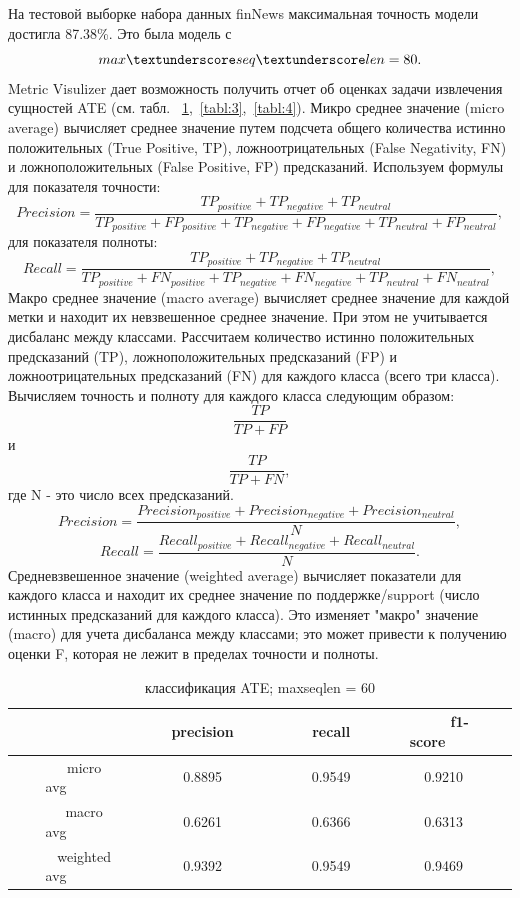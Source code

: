 На тестовой выборке набора данных finNews максимальная точность модели достигла 87.38\%. Это была модель с \[max\textunderscore seq\textunderscore len = 80.\] Metric Visulizer дает возможность получить отчет об оценках задачи извлечения сущностей ATE (см. табл. ~\ref{tabl:2},~\ref{tabl:3},~\ref{tabl:4}). Микро среднее значение (micro average) вычисляет среднее значение путем подсчета общего количества истинно положительных (True Positive, TP), ложноотрицательных (False Negativity, FN) и ложноположительных  (False Positive, FP) предсказаний. Используем формулы\\ для показателя точности: 
\[Precision = \frac{TP_{positive} + TP_{negative} + TP_{neutral}}{TP_{positive} + FP_{positive} + TP_{negative} + FP_{negative} + TP_{neutral} + FP_{neutral}},\]
для показателя полноты:
\[Recall = \frac{TP_{positive} + TP_{negative} + TP_{neutral}}{TP_{positive} + FN_{positive} + TP_{negative} + FN_{negative} + TP_{neutral} + FN_{neutral}},\]
Макро среднее значение (macro average) вычисляет среднее значение для каждой метки и находит их невзвешенное среднее значение. При этом не учитывается дисбаланс между классами. Рассчитаем количество истинно положительных предсказаний (TP), ложноположительных предсказаний (FP) и ложноотрицательных предсказаний (FN) для каждого класса (всего три класса). Вычисляем точность и полноту для каждого класса следующим образом: \[\frac{TP}{TP + FP}\] и \[\frac{TP}{TP + FN},\] где N - это число всех предсказаний.
\[Precision = \frac{Precision_{positive} + Precision_{negative} + Precision_{neutral}}{N},\]
\[Recall = \frac{Recall_{positive} + Recall_{negative} + Recall_{neutral}}{N}.\]
Средневзвешенное значение (weighted average) вычисляет показатели для каждого класса и находит их среднее значение по поддержке/support (число истинных предсказаний для каждого класса). Это изменяет "макро" значение (macro) для учета дисбаланса между классами; это может привести к получению оценки F, которая не лежит в пределах точности и полноты.
\begin{center}
\begin{table}[h!]
\centering
\caption{классификация ATE; max\textunderscore seq\textunderscore len = 60}
\label{tabl:2}
\begin{tabular}{|c|c|c|c|c|}
\hline
~~~~~~~~&~~~~precision~~~~&~~~~recall~~~~&~~~~f1-score~~~~\\
\hline
~~~~micro avg~~~~&	0.8895&	0.9549& 0.9210\\
\hline
~~~~macro avg~~~~& 0.6261  &	0.6366 & 0.6313\\
\hline
~~~~weighted avg~~~~&	0.9392  &	0.9549	& 0.9469\\
\hline
\end{tabular}
\end{table}
\end{center}


